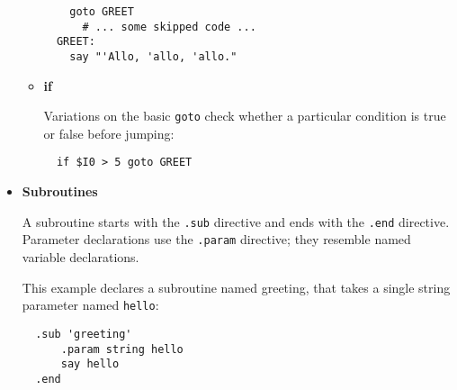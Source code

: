\begin{itemize}
\begin{itemize}
\begin{verbatim}
    goto GREET
      # ... some skipped code ...
  GREET:
    say "'Allo, 'allo, 'allo."
\end{verbatim}

\item {\bf if }

Variations on the basic \verb|goto| check whether a particular condition
is true or false before jumping:

\begin{verbatim}
  if $I0 > 5 goto GREET
\end{verbatim}
\end{itemize}

\item {\bf Subroutines }

A  subroutine starts with the \verb|.sub| directive and ends with the
\verb|.end| directive. 
Parameter declarations use the \verb|.param| directive;
they resemble named variable declarations. 

This example declares a
subroutine named greeting, that takes a single string parameter
named \verb|hello|:

\begin{verbatim}
  .sub 'greeting'
      .param string hello
      say hello
  .end
\end{verbatim}
\end{itemize}

